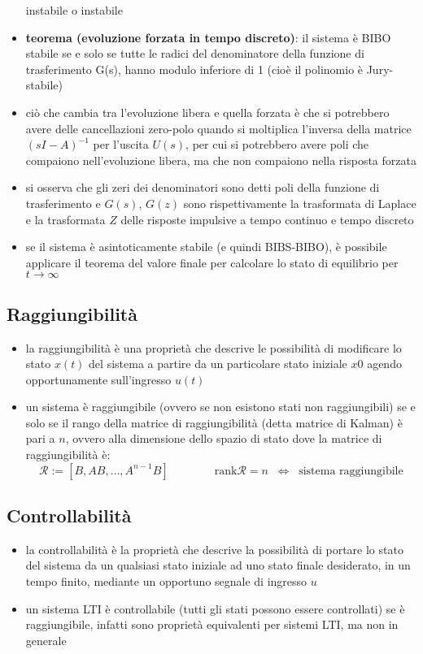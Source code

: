 \begin{itemize}
	instabile o instabile
	\item \textbf{teorema (evoluzione forzata in tempo discreto)}: il sistema è BIBO stabile se e solo se tutte le radici del
	denominatore della funzione di trasferimento G(s), hanno modulo inferiore di 1 (cioè il polinomio è Jury-stabile)
	\item ciò che cambia tra l'evoluzione libera e quella forzata è che si potrebbero avere delle cancellazioni zero-polo quando
	si moltiplica l'inversa della matrice \((sI-A)^{-1}\) per l'uscita \(U(s)\), per cui si potrebbero avere poli che compaiono
	nell'evoluzione libera, ma che non compaiono nella risposta forzata
	\item si osserva che gli zeri dei denominatori sono detti poli della funzione di trasferimento e \(G(s)\), \(G(z)\) sono
	rispettivamente la trasformata di Laplace e la trasformata \(Z\) delle risposte impulsive a tempo continuo e tempo discreto
	\item se il sistema è asintoticamente stabile (e quindi BIBS-BIBO), è possibile applicare il teorema del valore finale per
	calcolare lo stato di equilibrio per \(t \to \infty\)
\end{itemize}

\newpage

\subsection{Raggiungibilità}
\begin{itemize}
	\item la raggiungibilità è una proprietà che descrive le possibilità di modificare lo stato \(x(t)\) del sistema a partire
	da un particolare stato iniziale \(x0\) agendo opportunamente sull’ingresso \(u(t)\)
	\item un sistema è raggiungibile (ovvero se non esistono stati non raggiungibili) se e solo se il rango della matrice di
	raggiungibilità (detta matrice di Kalman) è pari a \(n\), ovvero alla dimensione dello spazio di stato dove la matrice di
	raggiungibilità è: \[\mathcal{R} := [B, AB, \dots, A^{n-1}B] \qquad\qquad \text{rank} \mathcal{R} = n \;\; \Leftrightarrow \;\; \text{sistema raggiungibile}\]
\end{itemize}

\subsection{Controllabilità}
\begin{itemize}
	\item la controllabilità è la proprietà che descrive la possibilità di portare lo stato del sistema da un qualsiasi stato
	iniziale ad uno stato finale desiderato, in un tempo finito, mediante un opportuno segnale di ingresso \(u\)
	\item un sistema LTI è controllabile (tutti gli stati possono essere controllati) se è raggiungibile, infatti sono proprietà
	equivalenti per sistemi LTI, ma non in generale
\end{itemize}

